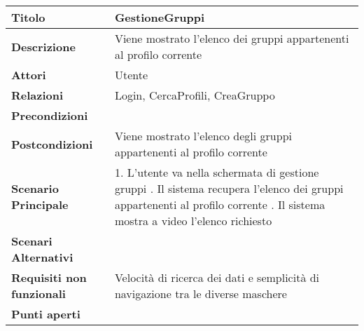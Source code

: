 \begin{tabular} {|P{4.5cm}|P{12.5cm}|}
  \hline
  \textbf{Titolo}                   & GestioneGruppi                                                        \\
  \hline
  \textbf{Descrizione}              & Viene mostrato l'elenco dei gruppi appartenenti al profilo corrente   \\
  \hline
  \textbf{Attori}                   & Utente                                                                \\
  \hline
  \textbf{Relazioni}                & Login, CercaProfili, CreaGruppo                                       \\
  \hline
  \textbf{Precondizioni}            &                                                                       \\
  \hline
  \textbf{Postcondizioni}           & Viene mostrato l'elenco degli gruppi appartenenti al profilo corrente \\
  \hline
  \textbf{Scenario Principale}      & 1. L'utente va nella schermata di gestione gruppi . Il sistema recupera l'elenco dei gruppi appartenenti al profilo corrente . Il sistema mostra a video l'elenco richiesto                                                           \\
  \hline
  \textbf{Scenari Alternativi}      &                                                                       \\
  \hline
  \textbf{Requisiti non funzionali} & Velocità di ricerca dei dati e
  semplicità di navigazione tra le diverse maschere                                                         \\
  \hline
  \textbf{Punti aperti}             &                                                                       \\
  \hline
\end{tabular}
\hfill
\break

